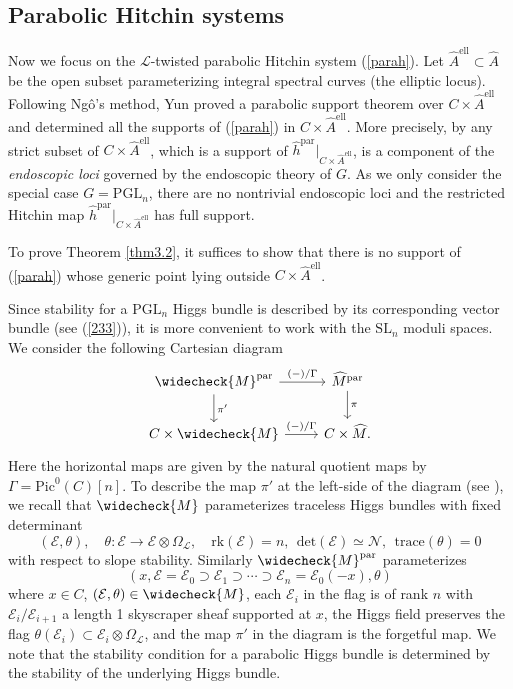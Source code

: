 \documentclass[11pt]{amsart}
\theoremstyle{plain}
\theoremstyle{definition}
\theoremstyle{remark}
\newcommand{\CE}{{\mathcal E}}
\newcommand{\CL}{{\mathcal L}}
\newcommand{\CN}{{\mathcal N}}
\begin{document}
\subsection{Parabolic Hitchin systems}
Now we focus on the $\CL$-twisted parabolic Hitchin system (\ref{parah}). Let $\widehat{A}^{\mathrm{ell}} \subset \widehat{A}$ be the open subset parameterizing integral spectral curves (the elliptic locus). Following Ng\^o's method, Yun \cite{Yun2, Yun3} proved a parabolic support theorem over $C \times \widehat{A}^{\mathrm{ell}}$ and determined all the supports of (\ref{parah}) in $C \times \widehat{A}^\mathrm{ell}$. More precisely, by \cite[Section 2]{Yun3} any strict subset of $C \times \widehat{A}^{\mathrm{ell}}$, which is a support of $\widehat{h}^{\mathrm{par}}|_{C \times \widehat{A}^{\mathrm{ell}}}$, is a component of the \emph{endoscopic loci} governed by the endoscopic theory of $G$. As we only consider the special case $G = \mathrm{PGL}_n$, there are no nontrivial endoscopic loci and the restricted Hitchin map $\widehat{h}^{\mathrm{par}}|_{C \times \widehat{A}^{\mathrm{ell}}}$ has full support.

To prove Theorem \ref{thm3.2}, it suffices to show that there is no support of (\ref{parah}) whose generic point lying outside $C \times \widehat{A}^{\mathrm{ell}}$.

Since stability for a $\mathrm{PGL}_n$ Higgs bundle is described by its corresponding vector bundle (see (\ref{233})), it is more convenient to work with the $\mathrm{SL}_n$ moduli spaces. We consider the following Cartesian diagram
\begin{equation}\label{diag321}
\begin{tikzcd}
\widecheck{M}^{\mathrm{par}} \arrow[r, "(-)/\Gamma"] \arrow[d, "\pi'"]
& \widehat{M}^{\mathrm{par}} \arrow[d, "\pi"] \\
C\times \widecheck{M} \arrow[r, "(-)/\Gamma"]
& C \times \widehat{M}.
\end{tikzcd}
\end{equation}
Here the horizontal maps are given by the natural quotient maps by $\Gamma = \mathrm{Pic}^0(C)[n]$. To describe the map $\pi'$ at the left-side of the diagram (see \cite[Example 2.2.5]{Yun1}),  we recall that $\widecheck{M}$ parameterizes traceless Higgs bundles with fixed determinant  
\[
(\CE, \theta) , \quad \theta: \CE \to \CE\otimes \Omega_\CL, \quad \mathrm{rk}(\CE) = n, ~~\mathrm{det}(\CE) \simeq \CN,~~ \mathrm{trace}(\theta) = 0
\]
with respect to slope stability. Similarly $\widecheck{M}^{\mathrm{par}}$ parameterizes 
\[
(x, \CE = \CE_0 \supset \CE_1 \supset \cdots \supset \CE_n =  \CE_0(-x), \theta)
\]
where $x\in C$, $(\CE, \theta) \in \widecheck{M}$, each $\CE_i$ in the flag is of rank $n$ with $\CE_i/\CE_{i+1}$ a length 1 skyscraper sheaf supported at $x$, the Higgs field preserves the flag $\theta(\CE_i) \subset \CE_i\otimes \Omega_\CL$, and the map $\pi'$ in the diagram is the forgetful map. We note that the stability condition for a parabolic Higgs bundle is determined by the stability of the underlying Higgs bundle. 
\end{document}
